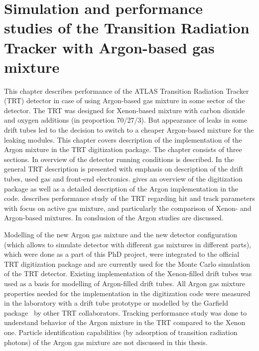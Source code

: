 \chapter{Simulation and performance studies of the Transition Radiation Tracker with Argon-based gas mixture}
\label{chap:TRT}


This chapter describes performance of the ATLAS Transition Radiation Tracker (TRT) detector in case of using 
Argon-based gas mixture in some sector of the detector.
The TRT was designed for Xenon-based mixture with carbon dioxide and oxygen additions (in proportion 70/27/3).
But appearance of leaks in some drift tubes led to the decision to switch to a cheaper Argon-based mixture for the leaking modules.
This chapter covers description of the implementation of the Argon mixture in the TRT digitization package.
The chapter consists of three sections. In  overview of the detector running conditions is described. In  the general TRT description is presented with emphasis on description of the drift tubes, used gas and front-end electronics.
 gives an overview of the digitization package as well as a detailed description of the Argon implementation in the code.
 describes performance study of the TRT regarding hit and track parameters with focus on active gas mixture, and particularly the comparison of 
Xenon- and Argon-based mixtures.
In  conslusion of the Argon studies are discussed.

Modelling of the new Argon gas mixture and the new detector configuration (which allows to simulate detector with different gas mixtures in different parts), 
which were done as a part of this PhD project, were integrated to the official TRT digitization package and are currently used for the Monte Carlo simulation of the TRT detector. 
Existing implementation of the Xenon-filled drift tubes was used as a basis for modelling of Argon-filled drift tubes.
All Argon gas mixture properties needed for the implementation in the digitization code were measured in the laboratory with a drift tube prototype 
or modelled by the Garfield package~\cite{garfield_program} by other TRT collaborators.
Tracking performance study was done to understand behavior of the Argon mixture in the TRT compared to the Xenon one.
Particle identification capabilities (by adsorption of transition radiation photons) of the Argon gas mixture are not discussed in this thesis.

